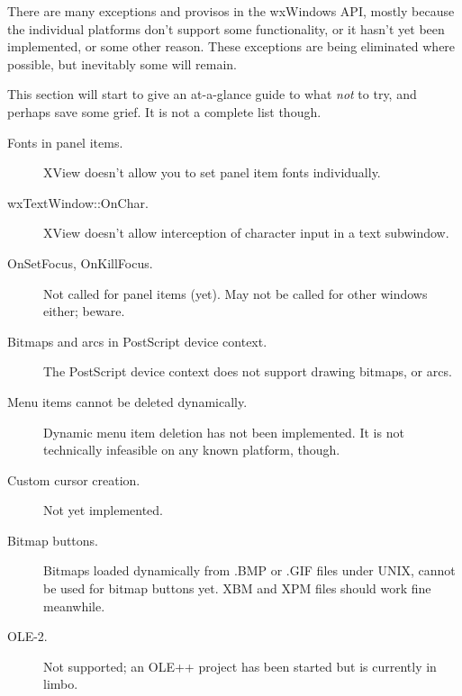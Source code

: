 There are many exceptions and provisos in the wxWindows API, mostly
because the individual platforms don't support some functionality,
or it hasn't yet been implemented, or some other reason. These
exceptions are being eliminated where possible, but inevitably
some will remain.

This section will start to give an at-a-glance guide to what {\it not}
to try, and perhaps save some grief.  It is not a complete list though.

\begin{description}
\item[Fonts in panel items.] XView doesn't allow you to
set panel item fonts individually.
\item[wxTextWindow::OnChar.] XView doesn't allow interception
of character input in a text subwindow.
\item[OnSetFocus, OnKillFocus.] Not called for panel items (yet).
May not be called for other windows either; beware.
\item[Bitmaps and arcs in PostScript device context.] The PostScript device
context does not support drawing bitmaps, or arcs.
\item[Menu items cannot be deleted dynamically.] Dynamic menu item deletion
has not been implemented. It is not technically infeasible on any known
platform, though.
\item[Custom cursor creation.] Not yet implemented.
\item[Bitmap buttons.] Bitmaps loaded dynamically from .BMP or .GIF
files under UNIX, cannot be used for bitmap buttons yet. XBM and XPM
files should work fine meanwhile.
\item[OLE-2.] Not supported; an OLE++ project has been started but is currently in limbo.
\end{description}

